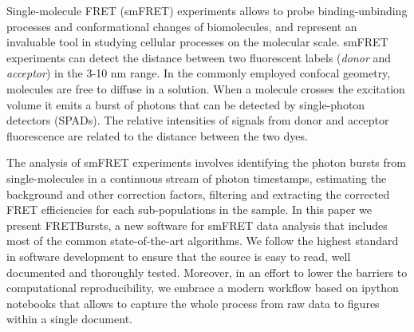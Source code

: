 Single-molecule FRET (smFRET) experiments allows to probe binding-unbinding processes and conformational changes of biomolecules, and represent an invaluable tool in studying cellular processes on the molecular scale\cite{Kapanidis_2006}. smFRET experiments can detect the distance between two fluorescent labels (\textit{donor} and \textit{acceptor}) in the 3-10 nm range. In the commonly employed confocal geometry, molecules are free to diffuse in a solution. When a molecule crosses the excitation volume it emits a burst of photons that can be detected by single-photon detectors (SPADs). 
The relative intensities of signals from donor and acceptor fluorescence are related to the distance between the two dyes.

The analysis of smFRET experiments involves identifying the photon bursts from single-molecules in a continuous stream of photon timestamps, estimating the background and other correction factors, filtering and extracting the corrected FRET efficiencies for each sub-populations in the sample. In this paper we present FRETBursts, a new software for smFRET data analysis that includes most of the common state-of-the-art algorithms. We follow the highest standard in software development to ensure that the source is easy to read, well documented and thoroughly tested. Moreover, in an effort to lower the barriers to computational reproducibility, we embrace a modern workflow based on ipython notebooks that allows to capture the whole process from raw data to figures within a single document.
